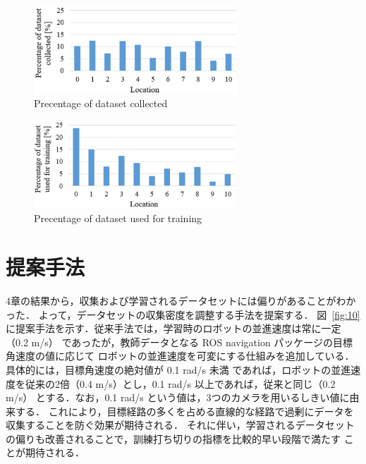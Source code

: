 \documentclass{jarticle}
\renewcommand{\figurename}{図~}
\newcommand{\figref}[1]{\figurename\ref{#1}}
\begin{document}
\begin{figure}[h!]
  \centering
   \includegraphics[height=33mm]{./pdf/set2.pdf}
   \caption{Precentage of dataset collected}
   \label{fig:8}
\end{figure}



\begin{figure}[h!]
  \centering
   \includegraphics[height=33mm]{./pdf/gaku2.pdf}
   \caption{Precentage of dataset used for training}
   \label{fig:9}
\end{figure}


\section{提案手法}
4章の結果から，収集および学習されるデータセットには偏りがあることがわかった．
よって，データセットの収集密度を調整する手法を提案する．
\figref{fig:10}に提案手法を示す．従来手法では，学習時のロボットの並進速度は常に一定（0.2 m/s）
であったが，教師データとなる ROS navigation パッケージの目標角速度の値に応じて
ロボットの並進速度を可変にする仕組みを追加している．具体的には，目標角速度の絶対値が 0.1 rad/s 未満
であれば，ロボットの並進速度を従来の2倍（0.4 m/s）とし，0.1 rad/s 以上であれば，従来と同じ（0.2 m/s）
とする．なお，0.1 rad/s という値は，3つのカメラを用いるしきい値に由来する．
これにより，目標経路の多くを占める直線的な経路で過剰にデータを収集することを防ぐ効果が期待される．
それに伴い，学習されるデータセットの偏りも改善されることで，訓練打ち切りの指標を比較的早い段階で満たす
ことが期待される．
\end{document}
